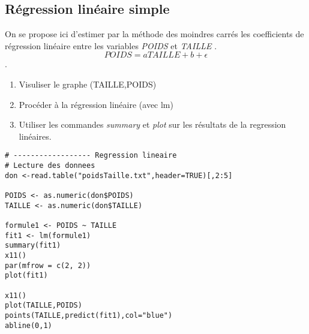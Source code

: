 \documentclass[12pt,twoside,openright]{article}
\begin{document}
\begin{enumerate}
\begin{verbatim}
\end{verbatim}
%
\subsection{Régression linéaire simple}
On se propose ici d’estimer par la méthode des moindres carrés les coefficients de régression linéaire
entre les variables \emph{POIDS} et \emph{TAILLE} . \\

$$POIDS = aTAILLE + b +\epsilon$$.
\begin{enumerate}
\item Visuliser le graphe (TAILLE,POIDS)
\item Procéder à la régression linéaire (avec lm)
\item Utiliser les commandes \emph{summary} et \emph{plot} sur les résultats de la regression linéaires.
\end{enumerate}


\begin{verbatim}
# ------------------ Regression lineaire
# Lecture des donnees
don <-read.table("poidsTaille.txt",header=TRUE)[,2:5]

POIDS <- as.numeric(don$POIDS)
TAILLE <- as.numeric(don$TAILLE)

formule1 <- POIDS ~ TAILLE
fit1 <- lm(formule1)
summary(fit1)
x11()
par(mfrow = c(2, 2))
plot(fit1)

x11()
plot(TAILLE,POIDS)
points(TAILLE,predict(fit1),col="blue")
abline(0,1)

\end{verbatim}

\end{enumerate}

\end{document}
